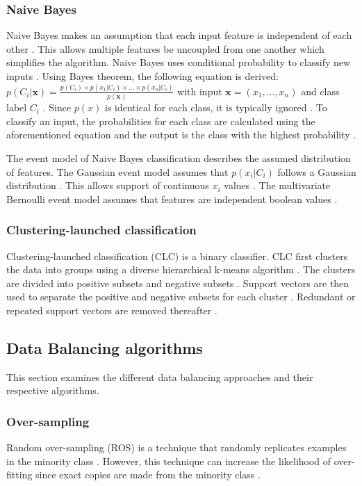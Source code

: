 \documentclass{sig-alternate-05-2015}
\begin{document}
	\subsubsection{Naive Bayes}
	Naive Bayes makes an assumption that each input feature is independent of each other \cite{Lewis1998, rish2001empirical}. This allows multiple features be uncoupled from one another which simplifies the algorithm. Naive Bayes uses conditional probability to classify new inputs \cite{Lewis1998}. Using Bayes theorem, the following equation is derived: $p(C_i|\textbf{x}) = \frac{p(C_i) \times p(x_1|C_i) \times...\times p(x_n|C_i)}{p(\textbf{x})}$ with input $\textbf{x} = (x_1,...,x_n)$ and class label $C_i$ \cite{Lewis1998, rish2001empirical}. Since $p(\textit{x})$ is identical for each class, it is typically ignored \cite{rish2001empirical}. To classify an input, the probabilities for each class are calculated using the aforementioned equation and the output is the class with the highest probability \cite{Lewis1998}.
	
	The event model of Naive Bayes classification describes the assumed distribution of features. The Gaussian event model assumes that $p(x_i|C_i)$ follows a Gaussian distribution \cite{John:1995:ECD:2074158.2074196}. This allows support of continuous $x_i$ values \cite{John:1995:ECD:2074158.2074196}. The multivariate Bernoulli event model assumes that features are independent boolean values \cite{mccallum1998comparison}.
	
	\subsubsection{Clustering-launched classification}
	Clustering-launched classification (CLC) is a binary classifier. CLC first clusters the data into groups using a diverse hierarchical k-means algorithm \cite{Luo20097562}. The clusters are divided into positive subsets and negative subsets \cite{Luo20097562}. Support vectors are then used to separate the positive and negative subsets for each cluster \cite{Luo20097562}. Redundant or repeated support vectors are removed thereafter \cite{Luo20097562}.
	
	\subsection{Data Balancing algorithms}
	This section examines the different data balancing approaches and their respective algorithms.
	\subsubsection{Over-sampling}
	Random over-sampling (ROS) is a technique that randomly replicates examples in the minority class \cite{Batista:2004:SBS:1007730.1007735}. However, this technique can increase the likelihood of over-fitting since exact copies are made from the minority class \cite{Batista:2004:SBS:1007730.1007735}.
	
\end{document}
